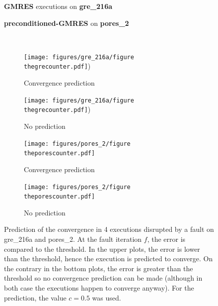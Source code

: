 \documentclass[twoside]{article}
\newcounter{fig}\setcounter{fig}{0}
\begin{document}
  \begin{figure}[H]
    \centering
    
    \begin{minipage}[b]{0.45\linewidth}
      \centering
      \textbf{GMRES} executions on \textbf{gre_216a} 
    \end{minipage}
    \quad
    \begin{minipage}{0.45\linewidth}
      \centering
      \textbf{preconditioned-GMRES} on \textbf{pores_2}
    \end{minipage}\\


    \begin{minipage}[b]{0.48\linewidth}
      \begin{subfigure}[t]{\linewidth}
        \centering
        \texttt{[image: figures/gre\_216a/figure\\thegrecounter.pdf]})
        \caption{Convergence prediction}\label{fig:gre_216a_conv_hist_prediction}		
      \end{subfigure}
      \quad
      \begin{subfigure}[t]{\linewidth}
        \centering
        \texttt{[image: figures/gre\_216a/figure\\thegrecounter.pdf]})
        \caption{No prediction}\label{fig:gre_216a_conv_hist_no_prediction}
      \end{subfigure}
    \end{minipage}
    \quad
    \begin{minipage}[b]{0.48\linewidth}
      \begin{subfigure}[t]{\linewidth}
        \centering
        \texttt{[image: figures/pores\_2/figure\\theporescounter.pdf]}
        \caption{Convergence prediction}\label{fig:pores_2_conv_hist_prediction}		
      \end{subfigure}
      \quad
      \begin{subfigure}[t]{\linewidth}
        \centering
        \texttt{[image: figures/pores\_2/figure\\theporescounter.pdf]}
        \caption{No prediction}\label{fig:pores_2_conv_hist_no_prediction}
      \end{subfigure}

      
    \end{minipage}
    \caption{Prediction of the convergence in 4 executions disrupted by a fault on gre_216a and pores_2. At the fault iteration $f$, the error is compared to the threshold. In the upper plots, the error is lower than the threshold, hence the execution is predicted to converge. On the contrary in the bottom plots, the error is greater than the threshold so no convergence prediction can be made (although in both case the executions happen to converge anyway). For the prediction, the value $c=0.5$ was used.}\label{fig:compared}
  \end{figure}
\end{document}
